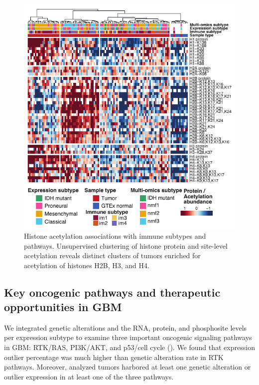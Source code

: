\begin{figure}[tb]
    \centering
    \includegraphics[width=0.6\linewidth]{figures/chap04_cptac_gbm_discov/figure5_histone_acetyl.pdf}
    \caption[Histone acetylation associations with immune subtypes and pathways.]{%
        Histone acetylation associations with immune subtypes and pathways.
        Unsupervised clustering of histone protein and site-level acetylation reveals distinct clusters of tumors enriched for acetylation of histones H2B, H3, and H4.
    }
    \label{fig:gbm-histone-acetyl}
\end{figure}


\subsection{Key oncogenic pathways and therapeutic opportunities in GBM}
We integrated genetic alterations and the RNA, protein, and phosphosite levels per expression subtype to examine three important oncogenic signaling pathways in GBM: RTK/RAS, PI3K/AKT, and p53/cell cycle (). We found that expression outlier percentage was much higher than genetic alteration rate in RTK pathways. Moreover, analyzed tumors harbored at least one genetic alteration or outlier expression in at least one of the three pathways.

